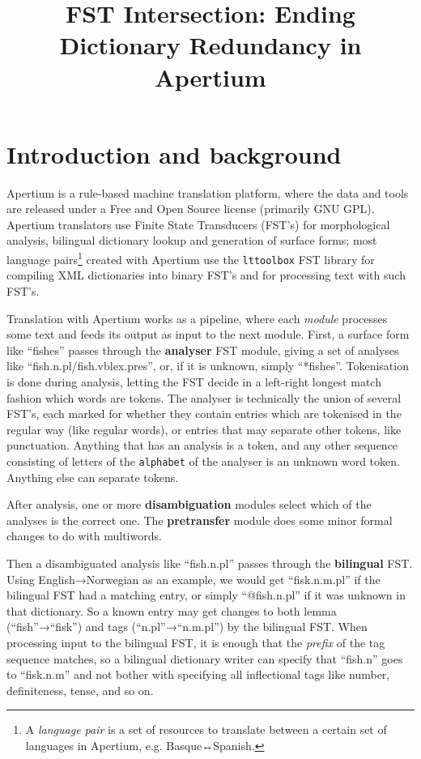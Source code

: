 \documentclass[10pt, a4paper]{article}
\title{FST Intersection: Ending Dictionary Redundancy in Apertium} %
\begin{document}
\maketitleabstract

\section{Introduction and background}

Apertium\cite{forcada2011afp} is a rule-based machine translation
platform, where the data and tools are released under a Free and Open
Source license (primarily GNU GPL). Apertium translators use Finite
State Transducers (FST's) for morphological analysis, bilingual
dictionary lookup and generation of surface forms; most language
pairs\footnote{A \emph{language pair} is a set of resources to
    translate between a certain set of languages in Apertium, e.g.
    Basque↔Spanish.} created with Apertium use the \texttt{lttoolbox} FST
library for compiling XML dictionaries into binary FST's and for
processing text with such FST's.


Translation with Apertium works as a pipeline, where each
\emph{module} processes some text and feeds its output as input to the
next module. First, a surface form like ``fishes'' passes through the
\textbf{analyser} FST module, giving a set of analyses like
``fish.n.pl/fish.vblex.pres'', or, if it is unknown, simply
``*fishes''. Tokenisation is done during analysis, letting the FST
decide in a left-right longest match fashion which words are tokens.
The analyser is technically the union of several FST's, each marked
for whether they contain entries which are tokenised in the regular
way (like regular words), or entries that may separate other tokens,
like punctuation. Anything that has an analysis is a token, and any
other sequence consisting of letters of the \texttt{alphabet} of the
analyser is an unknown word token. Anything else can separate tokens.

After analysis, one or more \textbf{disambiguation} modules select
which of the analyses is the correct one. The \textbf{pretransfer}
module does some minor formal changes to do with multiwords.

Then a disambiguated analysis like ``fish.n.pl'' passes through the
\textbf{bilingual} FST. Using English→Norwegian as an example, we
would get ``fisk.n.m.pl'' if the bilingual FST had a matching entry,
or simply ``@fish.n.pl'' if it was unknown in that dictionary. So a
known entry may get changes to both lemma (``fish''→``fisk'') and tags
(``n.pl''→``n.m.pl'') by the bilingual FST. When processing input to
the bilingual FST, it is enough that the \emph{prefix} of the tag
sequence matches, so a bilingual dictionary writer can specify that
``fish.n'' goes to ``fisk.n.m'' and not bother with specifying all
inflectional tags like number, definiteness, tense, and so on.
\end{document}
